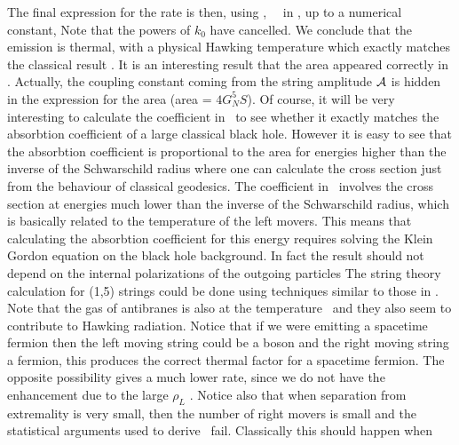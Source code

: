The final expression for the rate is then, using
\stringamplitude ,~
\rholeft ~in \ratenew , up to a numerical constant,
\eqn{}
Note that the powers of $k_0$ have cancelled. 
We conclude that the emission is thermal, with a physical
Hawking temperature
\eqn{}
which exactly matches the classical result \thwk  .
It is an interesting  result that the area appeared correctly in
\ratefinal . Actually,   the coupling constant coming from
the string amplitude $\cal A$   is hidden in the
expression for the area (area = $4 G_N^5 S $).
Of course, it will be very interesting
to calculate the   coefficient  in \ratefinal ~to
see whether it exactly matches the absorbtion coefficient
 of a large
classical black hole. However it is easy to see that the 
absorbtion coefficient is proportional to the area for 
energies higher than the inverse of the Schwarschild radius
where one can calculate the cross section just from the
behaviour of classical geodesics. The coefficient in 
\ratefinal\ involves the cross section at energies
much lower than the inverse of the Schwarschild radius, which
is basically related to the temperature of the left movers. 
This means that calculating 
the absorbtion coefficient for this energy
requires solving the Klein Gordon equation on the
black hole background.  
In fact the result should not
depend on the internal polarizations of the outgoing
particles
The string theory calculation for (1,5) strings could  be done
using techniques similar to those in \luma .
Note that  the gas of antibranes is also at 
the temperature \hawkingstring\ and they also seem to   contribute 
to  Hawking radiation.
Notice that if we were emitting a spacetime fermion then
the left moving string could be a boson and the right moving
string a fermion, this produces the correct thermal factor
for a spacetime fermion. The opposite possibility gives
a much lower rate, since we do not have the enhancement
due to the large $\rho_L$ \rholeft . Notice also that
when separation from extremality is very small, then the number
of right movers is small and the statistical arguments used
to derive \ratefinal\ fail. Classically this should happen when
